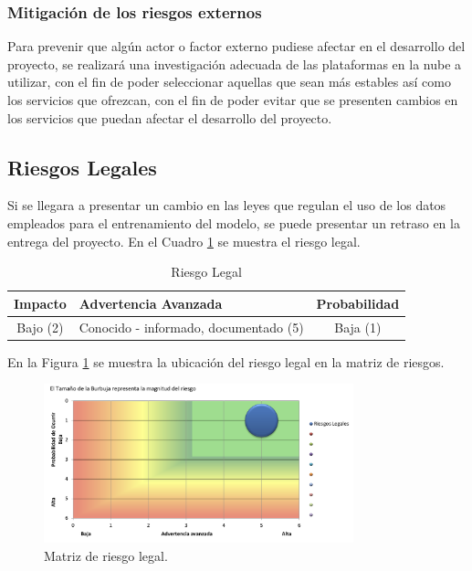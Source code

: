 \subsubsection{Mitigación de los riesgos externos}

Para prevenir que algún actor o factor externo pudiese afectar en el desarrollo
del proyecto, se realizará una investigación adecuada de las plataformas en la
nube a utilizar, con el fin de poder seleccionar aquellas que sean más estables
así como los servicios que ofrezcan, con el fin de poder evitar que se presenten
cambios en los servicios que puedan afectar el desarrollo del proyecto.

\subsection{Riesgos Legales}

Si se llegara a presentar un cambio en las leyes que regulan el uso de los datos
empleados para el entrenamiento del modelo, se puede presentar un retraso en la
entrega del proyecto. En el Cuadro \ref{table:riesgo_legal} se muestra el riesgo
legal.

\begin{table}[H]
\centering
\begin{tabular}{|c|p{5cm}|c|}
\hline
\rowcolor{azulclaro}
  \centering\textbf{Impacto} & \centering\textbf{Advertencia Avanzada}\arraybackslash & \centering\textbf{Probabilidad}\arraybackslash \\
\hline
  Bajo (2) & Conocido - informado, documentado (5) & Baja (1) \\
\hline
\end{tabular}
\caption{Riesgo Legal}
\label{table:riesgo_legal}
\end{table}

En la Figura \ref{fig:riesgo_legal} se muestra la ubicación del riesgo legal
en la matriz de riesgos.

\begin{figure}[H]
  \centering
  \includegraphics[width=0.8\textwidth]{imagenes/03-analisis/analisis-riesgos/riesgo-legal.png}
  \caption{Matriz de riesgo legal.}
  \label{fig:riesgo_legal}
\end{figure}

